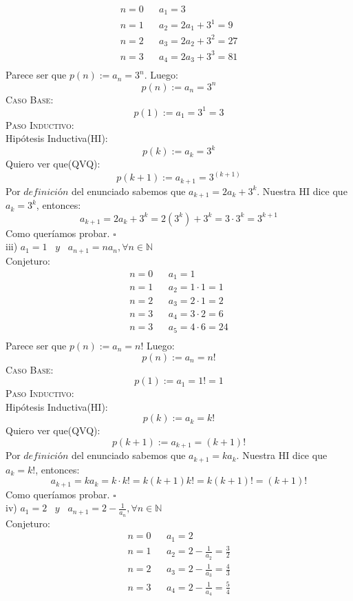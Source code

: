 \documentclass[a4paper,11pt]{article}
\begin{document}
\begin{align*}
n = 0 & &a_1 = 3 \\
n = 1 & &a_2 = 2a_1 + 3^1 = 9\\ 
n = 2 & &a_3 = 2a_2 + 3^2 = 27\\
n = 3 & &a_4 = 2a_3 + 3^3 = 81\\
\end{align*}
Parece ser que $p(n) := a_n = 3^n$. Luego:
\[p(n) := a_n = 3^n\]
\textsc{Caso Base}:\\
\[p(1):= a_1 = 3^1 = 3 \]
\textsc{Paso Inductivo}:\\
Hipótesis Inductiva(HI):\[p(k):= a_k = 3^k\]
Quiero ver que(QVQ):\[p(k+1):= a_{k+1} = 3^(k+1)\]
Por $\textit{definición}$ del enunciado sabemos que $a_{k+1} = 2a_k + 3^k  $. Nuestra HI dice que $a_k =  3^k$, entonces:\\
\[a_{k+1}= 2a_k + 3^k = 2(3^k) + 3^k = 3 \cdot 3^k = 3^{k+1}\]
Como queríamos probar.
\hfill$\square$\\
iii) $a_1 = 1\;\;\;y\;\;\;a_{n+1} = na_n, \forall n \in \mathbb{N}$\\
Conjeturo:\\ 
\begin{align*}
n = 0 & &a_1 = 1 \\
n = 1 & &a_2 = 1 \cdot 1 = 1 \\ 
n = 2 & &a_3 = 2 \cdot 1 = 2\\
n = 3 & &a_4 = 3 \cdot 2 = 6\\
n = 3 & &a_5 = 4 \cdot 6 = 24\\
\end{align*}
Parece ser que $p(n) := a_n = n!$ Luego:
\[p(n) := a_n = n!\]
\textsc{Caso Base}:\\
\[p(1):= a_1 = 1! = 1 \]
\textsc{Paso Inductivo}:\\
Hipótesis Inductiva(HI):\[p(k):= a_k = k!\]
Quiero ver que(QVQ):\[p(k+1):= a_{k+1} = (k+1)!\]
Por $\textit{definición}$ del enunciado sabemos que $a_{k+1} = ka_k$. Nuestra HI dice que $a_k =  k!$, entonces:\\
\[a_{k+1}= ka_k = k\cdot k! = k(k+1)k! = k(k+1)! = (k+1)!\]
Como queríamos probar.
\hfill$\square$\\
iv) $a_1 = 2\;\;\;y\;\;\;a_{n+1} = 2 - \frac{1}{a_n}, \forall n \in \mathbb{N}$\\
Conjeturo:\\ 
\begin{align*}
n = 0 & &a_1 = 2 \\
n = 1 & &a_2 = 2 - \frac{1}{a_2} = \frac{3}{2} \\ 
n = 2 & &a_3 = 2 - \frac{1}{a_3} = \frac{4}{3}\\
n = 3 & &a_4 = 2 - \frac{1}{a_4} = \frac{5}{4}\\
\end{align*}
\end{document}
